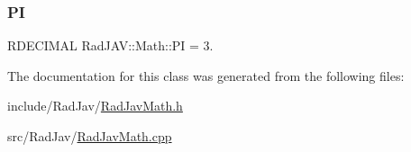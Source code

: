 \mbox{\label{class_rad_j_a_v_1_1_math_adcedcfba45466c6793acb2b80ffccfed}} 
\subsubsection{\texorpdfstring{PI}{PI}}
{\footnotesize\ttfamily R\+D\+E\+C\+I\+M\+AL Rad\+J\+A\+V\+::\+Math\+::\+PI = 3.\hspace{0.3cm}{\ttfamily [static]}}



The documentation for this class was generated from the following files\+:\begin{DoxyCompactItemize}
\item 
include/\+Rad\+Jav/\mbox{\hyperlink{_rad_jav_math_8h}{Rad\+Jav\+Math.\+h}}\item 
src/\+Rad\+Jav/\mbox{\hyperlink{_rad_jav_math_8cpp}{Rad\+Jav\+Math.\+cpp}}\end{DoxyCompactItemize}
